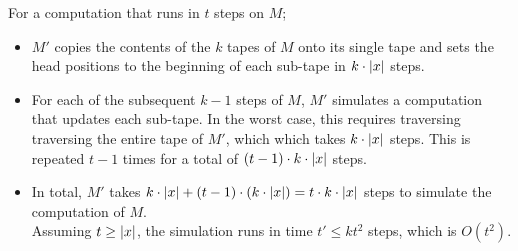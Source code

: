 \begin{Answer}
  \newpage
  \step
  For a computation that runs in $t$ steps on $M$;
  \begin{itemize}
    \item $M'$ copies the contents of the $k$ tapes of $M$
      onto its single tape and sets the head positions to the beginning
      of each sub-tape in $k\cdot\lvert x\rvert$ steps.
    \item For each of the subsequent $k-1$ steps of $M$, $M'$
      simulates a computation that updates each sub-tape.
      In the worst case, this requires traversing traversing
      the entire tape of $M'$, which which takes $k\cdot\lvert x\rvert$ steps.
      This is repeated $t-1$ times for a total of
      $(t-1)\cdot k\cdot\lvert x\rvert$ steps.
    \item In total, $M'$ takes $k\cdot\lvert x\rvert + (t-1)\cdot (k\cdot\lvert x\rvert)
      = t \cdot k\cdot\lvert x\rvert$
      steps to simulate the computation of $M$.\\
      Assuming $t \geq \lvert x\rvert$, the simulation runs in time $t' \leq kt^2$ steps,
      which is $O(t^2)$. 
      
  \end{itemize}


\end{Answer}
